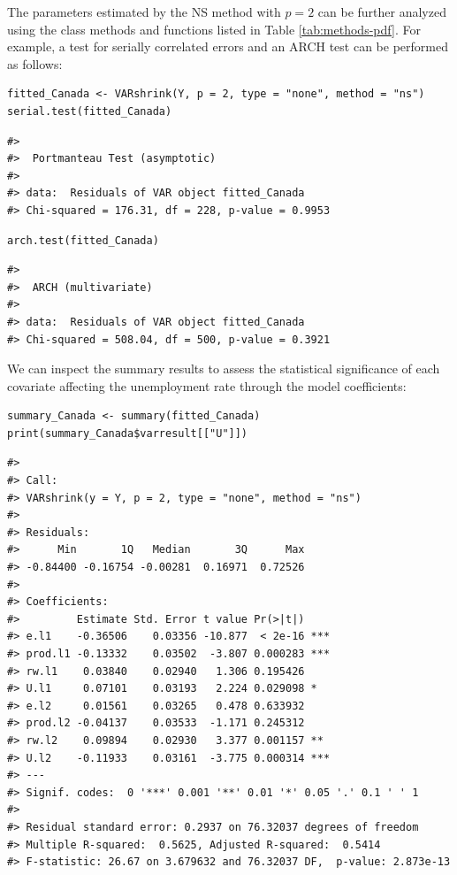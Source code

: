 The parameters estimated by the NS method with \(p=2\) can be further analyzed using the class methods and functions listed in Table \ref{tab:methods-pdf}. For example, a test for serially correlated errors and an ARCH test can be performed as follows:

\begin{verbatim}
fitted_Canada <- VARshrink(Y, p = 2, type = "none", method = "ns")
serial.test(fitted_Canada)
\end{verbatim}

\begin{verbatim}
#> 
#>  Portmanteau Test (asymptotic)
#> 
#> data:  Residuals of VAR object fitted_Canada
#> Chi-squared = 176.31, df = 228, p-value = 0.9953
\end{verbatim}

\begin{verbatim}
arch.test(fitted_Canada)
\end{verbatim}

\begin{verbatim}
#> 
#>  ARCH (multivariate)
#> 
#> data:  Residuals of VAR object fitted_Canada
#> Chi-squared = 508.04, df = 500, p-value = 0.3921
\end{verbatim}

We can inspect the summary results to assess the statistical significance of each covariate affecting the unemployment rate through the model coefficients:

\begin{verbatim}
summary_Canada <- summary(fitted_Canada)
print(summary_Canada$varresult[["U"]])
\end{verbatim}

\begin{verbatim}
#> 
#> Call:
#> VARshrink(y = Y, p = 2, type = "none", method = "ns")
#> 
#> Residuals:
#>      Min       1Q   Median       3Q      Max 
#> -0.84400 -0.16754 -0.00281  0.16971  0.72526 
#> 
#> Coefficients:
#>         Estimate Std. Error t value Pr(>|t|)    
#> e.l1    -0.36506    0.03356 -10.877  < 2e-16 ***
#> prod.l1 -0.13332    0.03502  -3.807 0.000283 ***
#> rw.l1    0.03840    0.02940   1.306 0.195426    
#> U.l1     0.07101    0.03193   2.224 0.029098 *  
#> e.l2     0.01561    0.03265   0.478 0.633932    
#> prod.l2 -0.04137    0.03533  -1.171 0.245312    
#> rw.l2    0.09894    0.02930   3.377 0.001157 ** 
#> U.l2    -0.11933    0.03161  -3.775 0.000314 ***
#> ---
#> Signif. codes:  0 '***' 0.001 '**' 0.01 '*' 0.05 '.' 0.1 ' ' 1
#> 
#> Residual standard error: 0.2937 on 76.32037 degrees of freedom
#> Multiple R-squared:  0.5625, Adjusted R-squared:  0.5414 
#> F-statistic: 26.67 on 3.679632 and 76.32037 DF,  p-value: 2.873e-13
\end{verbatim}

